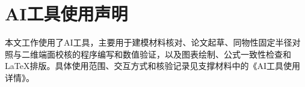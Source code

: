 \section*{AI工具使用声明}
本文工作使用了AI工具，主要用于建模材料核对、论文起草、同物性固定半径对照与二维端面校核的程序编写和数值验证，以及图表绘制、公式一致性检查和LaTeX排版。具体使用范围、交互方式和核验记录见支撑材料中的《AI工具使用详情》。

